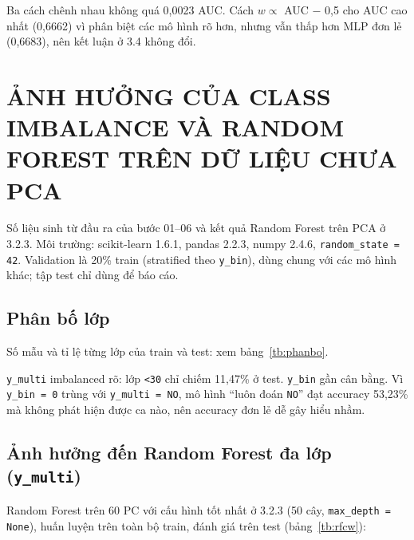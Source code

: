 \documentclass[a4paper]{report}
\begin{document}
Ba cách chênh nhau không quá 0,0023 AUC. Cách $w \propto$ AUC $-$ 0,5 cho AUC cao nhất (0,6662) vì phân biệt các mô hình rõ hơn, nhưng vẫn thấp hơn MLP đơn lẻ (0,6683), nên kết luận ở 3.4 không đổi.

\section{ẢNH HƯỞNG CỦA CLASS IMBALANCE VÀ RANDOM FOREST TRÊN DỮ LIỆU CHƯA PCA}

Số liệu sinh từ đầu ra của bước 01–06 và kết quả Random Forest trên PCA ở 3.2.3. Môi trường: scikit-learn 1.6.1, pandas 2.2.3, numpy 2.4.6, \texttt{random\_\allowbreak{}state = 42}. Validation là 20\% train (stratified theo \texttt{y\_\allowbreak{}bin}), dùng chung với các mô hình khác; tập test chỉ dùng để báo cáo.

\subsection{Phân bố lớp}

Số mẫu và tỉ lệ từng lớp của train và test: xem bảng~\ref{tb:phanbo}.

\texttt{y\_\allowbreak{}multi} imbalanced rõ: lớp \texttt{<30} chỉ chiếm 11,47\% ở test. \texttt{y\_\allowbreak{}bin} gần cân bằng. Vì \texttt{y\_\allowbreak{}bin = 0} trùng với \texttt{y\_\allowbreak{}multi = NO}, mô hình “luôn đoán \texttt{NO}” đạt accuracy 53,23\% mà không phát hiện được ca nào, nên accuracy đơn lẻ dễ gây hiểu nhầm.

\subsection{Ảnh hưởng đến Random Forest đa lớp (\texorpdfstring{\texttt{y\_\allowbreak{}multi}}{y\textunderscore multi})}

Random Forest trên 60 PC với cấu hình tốt nhất ở 3.2.3 (50 cây, \texttt{max\_\allowbreak{}depth = None}), huấn luyện trên toàn bộ train, đánh giá trên test (bảng~\ref{tb:rfcw}):
\end{document}
